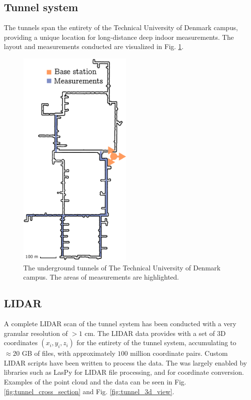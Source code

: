 \subsection{Tunnel system}
The tunnels span the entirety of the Technical University of Denmark campus, providing a unique location for long-distance deep indoor measurements. The layout and measurements conducted are visualized in Fig. \ref{fig:underground_tunnel_system}.

\begin{figure}
    \centering
    \includegraphics[width=0.5\textwidth]{chapters/part_pathloss/figures/outdoor_to_indoor/Complete_tunnel_system.eps}
    \caption{The underground tunnels of The Technical University of Denmark campus. The areas of measurements are highlighted.}
    \label{fig:underground_tunnel_system}
\end{figure}





\subsection{LIDAR}
A complete LIDAR scan of the tunnel system has been conducted with a very granular resolution of $> 1$ cm. The LIDAR data provides with a set of $3$D coordinates $(x_i, y_i, z_i)$ for the entirety of the tunnel system, accumulating to $\approx 20$ GB of files, with approximately $100$ million coordinate pairs. Custom LIDAR scripts have been written to process the data. The was largely enabled by libraries such as LasPy \cite{Grantbrown/laspy:1.0-1.4.} for LIDAR file processing, and \cite{alan_d_snow_2020_3714221} for coordinate conversion. Examples of the point cloud and the data can be seen in Fig. \ref{fig:tunnel_cross_section} and Fig. \ref{fig:tunnel_3d_view}.

